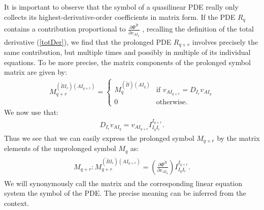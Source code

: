 It is important to observe that the symbol of a quasilinear PDE really only collects its highest-derivative-order coefficients in matrix form.
If the PDE $R_q$ contains a contribution proportional to $\frac{\partial \Phi^{\tilde{B}}}{\partial v_{AI_q}}$ , recalling the definition of the total derivative (\ref{totDer}), we find that the prolonged PDE $R_{q+r}$ involves precisely the same contribution, but multiple times and possibly in multiple of its individual equations. 
To be more precise, the matrix components of the prolonged symbol matrix are given by:
\begin{align}
M_{q+r}^{(\tilde{B}I_r) (AI_{q+r})} = 
\begin{cases}
M_q^{(\tilde{B}) (AI_q)}  & \text{if \ \ }  
    v_{AI_{q+r}} = D_{I_r} v_{AI_q} \\
0 & \text{otherwise}.
\end{cases}
\end{align} 
We now use that: 
\begin{align}
    D_{I_r}v_{AI_q} = v_{AI_{q+r}}I_{I_q I_r}^{I_{q+r}}.
\end{align}
Thus we see that we can easily express the prolonged symbol $M_{q+r}$ by the matrix elements of the unprolonged symbol $M_q$ as:
\begin{align}
    \begin{aligned}
    M_{q+r} : M_{q+r} ^{(\tilde{B}I_r) (AI_{q+r})}  = \left ( \frac{\partial \Phi^{\tilde{B}}}{\partial v_{AI_q}} \right ) I_{I_q I_r}^{I_{q+r}} .
    \end{aligned}
\end{align}
We will synonymously call the matrix and the corresponding linear equation system the symbol of the PDE. The precise meaning can be inferred from the context. 


